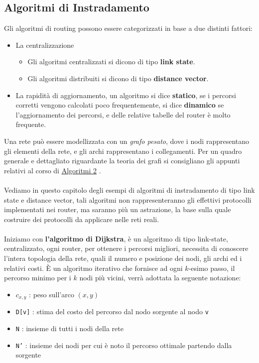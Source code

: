 \documentclass[12pt, letterpaper]{article}
\newcommand{\codee}[1]{\colorbox{white}{\texttt{#1}}}
\newcommand{\acc}{\\\hphantom{}\\}
\begin{document}
\subsection{Algoritmi di Instradamento}
Gli algoritmi di routing possono essere categorizzati in base a due distinti fattori: \begin{itemize}
    \item La centralizzazione \begin{itemize}
        \item Gli algoritmi centralizzati si dicono di tipo \textbf{link state}.
        \item Gli algoritmi distribuiti si dicono di tipo \textbf{distance vector}.
    \end{itemize}
    \item La rapidità di aggiornamento, un algoritmo si dice \textbf{statico}, se i percorsi corretti vengono 
    calcolati poco frequentemente, si dice \textbf{dinamico} se l'aggiornamento dei percorsi, e delle relative 
    tabelle del router è molto frequente.
\end{itemize}
Una rete può essere modellizzata con un \textit{grafo pesato}, dove i nodi rappresentano gli elementi della rete, 
e gli archi rappresentano i collegamenti. Per un quadro generale e dettagliato riguardante la teoria dei grafi 
si consigliano gli appunti relativi al corso di 
\color{blue}\href{https://github.com/CasuFrost/University_notes/blob/main/Secondo%20Anno/Secondo%20Semestre/Progettazione%20di%20Algoritmi/Latex%20source%20file/Progettazione%20di%20Algoritmi.pdf}{Algoritmi 2}
\color{black}.
\acc
Vediamo in questo capitolo degli esempi di algoritmi di instradamento di tipo link state e distance vector, tali algoritmi 
non rappresenteranno gli effettivi protocolli implementati nei router, ma saranno più un astrazione, la base sulla 
quale costruire dei protocolli da applicare nelle reti reali.\acc 
Iniziamo con \textbf{l'algoritmo di Dijkstra}, è un algoritmo di tipo link-state, centralizzato, ogni router, per ottenere 
i percorsi migliori, necessita di conoscere l'intera topologia della rete, quali il numero e posizione dei nodi, gli 
archi ed i relativi costi. 
È un algoritmo iterativo che fornisce ad ogni $k$-esimo  passo, il percorso minimo per i $k$ nodi più vicini, verrà 
adottata la seguente notazione:
\begin{itemize}
    \item $c_{x,y}$ : peso sull'arco $(x,y)$
    \item \codee{D[v]} : stima del costo del percorso dal nodo sorgente al nodo \codee{v}
    \item \codee{N} : insieme di tutti i nodi della rete
    \item \codee{N'} : insieme dei nodi per cui è noto il percorso ottimale partendo dalla sorgente
\end{itemize} 
\end{document}
